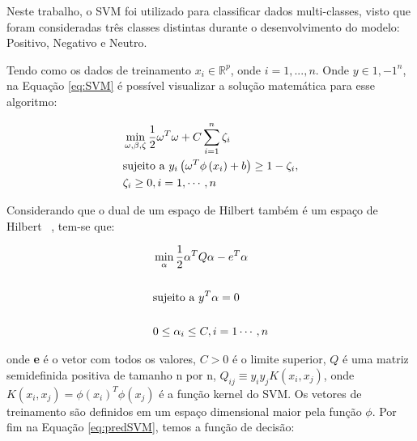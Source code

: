 
        Neste trabalho, o SVM foi utilizado para classificar dados multi-classes, visto que foram consideradas três classes distintas durante o desenvolvimento do modelo: Positivo, Negativo e Neutro.
        
        Tendo como os dados de treinamento $x_{i} \in \mathbb{R}^{p}$, onde $i = 1,...,n$. Onde $y \in {1,-1}^n$, na Equação \ref{eq:SVM} é
        possível visualizar a solução matemática para esse algoritmo:

        \begin{equation}\label{eq:SVM}
          \begin{aligned}
            & \min_{\omega,\beta, \zeta } \frac{1}{2}\omega^{T}\omega + C \sum_{i=1}^{n}\zeta_{i}\\
            & \textup{sujeito a } y_{i}\left ( \omega^{T}\phi \left ( x_{i} \right ) +b \right )\geq 1 - \zeta_{i},\\
            & \zeta_{i}\geq 0, i = 1,\cdots, n
        \end{aligned}
        \end{equation}

        Considerando que o dual de um espaço de Hilbert também é um espaço de Hilbert ~\cite{lorena2007introduccao}, tem-se que:


        \begin{equation}\label{eq:svmdual}
          \begin{aligned}
            & \min_{\alpha} \frac{1}{2}\alpha^{T}Q\alpha - e^{T}\alpha\\ \\
            & \textup{sujeito a }  y^{T}\alpha = 0 \\ \\
            & 0\leq \alpha_{i}\leq C, i= 1\cdots, n 
        \end{aligned}
        \end{equation}

        onde \textbf{e} é o vetor com todos os valores, $C>0$ é o limite superior, $Q$ é uma matriz semidefinida positiva de tamanho n por n,
        $Q_{ij}\equiv y_{i}y_{j}K(x_{i},x_{j})$, onde $K(x_{i},x_{j}) = \phi(x_{i})^{T}\phi(x_{j})$ é a função kernel do \acrshort{SVM}. Os 
        vetores de treinamento são definidos em um espaço dimensional maior pela função $\phi$.
        Por fim na Equação \ref{eq:predSVM}, temos a função de decisão:

